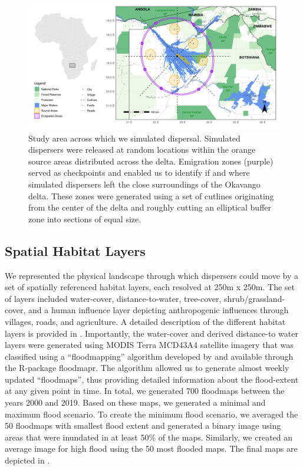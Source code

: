 \documentclass[abstract=on,10pt,a4paper,bibliography=totocnumbered]{article}
\begin{document}
\begin{figure}
  \begin{center}
  \includegraphics[width = \textwidth]{99_StudyArea.png}
  \caption{Study area across which we simulated dispersal. Simulated dispersers
  were released at random locations within the orange source areas distributed
  across the delta. Emigration zones (purple) served as checkpoints and enabled
  us to identify if and where simulated dispersers left the close surroundings
  of the Okavango delta. These zones were generated using a set of cutlines
  originating from the center of the delta and roughly cutting an elliptical
  buffer zone into sections of equal size.}
  \label{StudyArea}
  \end{center}
\end{figure}

\subsection{Spatial Habitat Layers}
We represented the physical landscape through which dispersers could move by a
set of spatially referenced habitat layers, each resolved at 250m x 250m. The
set of layers included water-cover, distance-to-water, tree-cover,
shrub/grassland-cover, and a human influence layer depicting anthropogenic
influences through villages, roads, and agriculture. A detailed description of
the different habitat layers is provided in . Importantly,
the water-cover and derived distance-to water layers were generated using MODIS
Terra MCD43A4 satellite imagery that was classified using a ``floodmapping''
algorithm developed by \citep{Wolski.2017} and available through the R-package
\textsf{floodmapr}. The algorithm allowed us to generate almost weekly updated
``floodmaps'', thus providing detailed information about the flood-extent at any
given point in time. In total, we generated 700 floodmaps between the years 2000
and 2019. Based on these maps, we generated a minimal and maximum flood
scenario. To create the minimum flood scenario, we averaged the 50 floodmaps
with smallest flood extent and generated a binary image using areas that were
inundated in at least 50\% of the maps. Similarly, we created an average image
for high flood using the 50 most flooded maps. The final maps are depicted in
.
\end{document}
